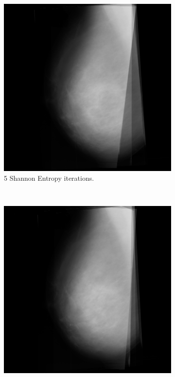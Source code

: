\begin{figure}[H]
    \centering
    \begin{subfigure}[t]{0.3\textwidth}
        \includegraphics[width=\textwidth]{Appendix5/sample2/shannon/5_scan.png}
        \caption{5 Shannon Entropy iterations.}
        \label{fig:app-5-shannon-sample2}
    \end{subfigure} \hfill
    ~ %
    \begin{subfigure}[t]{0.3\textwidth}
        \includegraphics[width=\textwidth]{Appendix5/sample2/shannon/10_scan.png}

\end{subfigure}
\end{figure}
